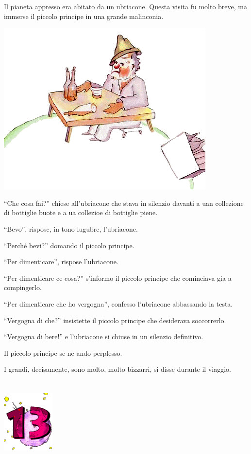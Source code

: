 \documentclass[11pt]{scrbook}
\begin{document}
Il pianeta appresso era abitato da un ubriacone. Questa visita fu molto
breve, ma immerse il piccolo principe in una grande malinconia.

\begin{center}
\includegraphics{./img/12a.png}
\end{center}

``Che cosa fai?'' chiese all'ubriacone che stava in silenzio davanti a
uan collezione di bottiglie buote e a ua collezioe di bottiglie piene.

``Bevo'', rispose, in tono lugubre, l'ubriacone.

``Perché bevi?'' domando il piccolo principe.

``Per dimenticare'', rispose l'ubriacone.

``Per dimenticare ce cosa?'' s'informo il piccolo principe che
cominciava gia a compingerlo.

``Per dimenticare che ho vergogna'', confesso l'ubriacone abbassando la
testa.

``Vergogna di che?'' insistette il piccolo principe che desiderava
soccorrerlo.

``Vergogna di bere!'' e l'ubriacone si chiuse in un silenzio definitivo.

Il piccolo principe se ne ando perplesso.

I grandi, decisamente, sono molto, molto bizzarri, si disse durante il
viaggio.

\chapter{}
\begin{center}
\includegraphics{./img/chapter13.png}
\end{center}
\end{document}
